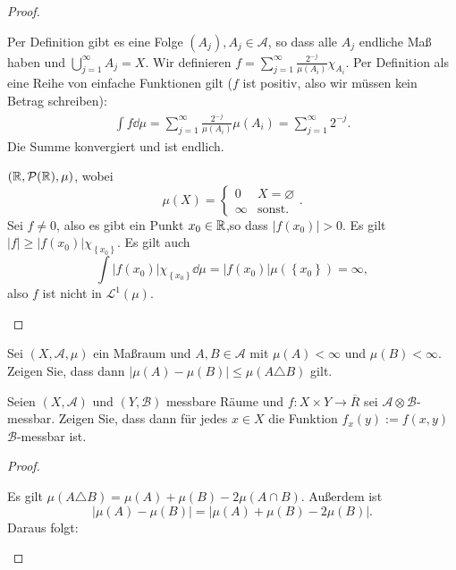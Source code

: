 \begin{proof}
	\begin{parts}
	\item Per Definition gibt es eine Folge $(A_j),A_j\in \mathcal{A}$, so dass alle $A_j$ endliche Maß haben und $\bigcup_{j=1} ^\infty A_j=X$. Wir definieren $f=\sum_{j=1}^\infty \frac{2^{-j}}{\mu(A_i)}\chi_{A_i}$. Per Definition als eine Reihe von einfache Funktionen gilt ($f$ ist positiv, also wir müssen kein Betrag schreiben):
		\begin{align*}
			\int f\dd{\mu}=\sum_{j=1}^\infty \frac{2^{-j}}{\mu(A_i)}\mu(A_i)=\sum_{j=1}^\infty 2^{-j}.
		\end{align*}
		Die Summe konvergiert und ist endlich.
	\item $(\mathbb{R}, \mathcal{P}(\mathbb{R}), \mu)$, wobei
		\[
		\mu(X)=\begin{cases}
			0 & X=\varnothing\\
			\infty & \text{sonst.}
		\end{cases}
		.\] 
		Sei $f\neq 0$, also es gibt ein Punkt $x_0\in \mathbb{R}$,so dass $|f(x_0)|>0$. Es gilt $|f|\ge |f(x_0)|\chi_{\left\{ x_0 \right\} }$. Es gilt auch
		\[
			\int |f(x_0)|\chi_{\left\{ x_0 \right\} }\dd{\mu}=|f(x_0)|\mu(\left\{ x_0 \right\} )=\infty
		,\]
		also $f$ ist nicht in $\mathcal{L}^1(\mu)$.\qedhere 
	\end{parts}
\end{proof}
\begin{Problem}
\begin{parts}
\item Sei $(X,\mathcal{A},\mu)$ ein Maßraum und $A,B\in \mathcal{A}$ mit $\mu(A)<\infty$ und $\mu(B)<\infty$. Zeigen Sie, dass dann $|\mu(A)-\mu(B)|\le\mu(A\triangle B)$ gilt.
\item Seien $(X,\mathcal{A})$ und $(Y,\mathcal{B})$ messbare Räume und $f:X\times Y\to \overline{R}$ sei $\mathcal{A}\otimes \mathcal{B}$-messbar. Zeigen Sie, dass dann f\"{u}r jedes $x\in X$ die Funktion $f_x(y):=f(x,y)$ $\mathcal{B}$-messbar ist.
\end{parts}
\end{Problem}
\begin{proof}
	\begin{parts}
	\item Es gilt $\mu(A\triangle B)=\mu(A)+\mu(B)-2\mu(A\cap B)$. Außerdem ist
		\[
		\left| \mu(A)-\mu(B) \right| =\left| \mu(A)+\mu(B)-2\mu(B) \right| 
		.\] 
		Daraus folgt:
	\end{parts}
\end{proof}
